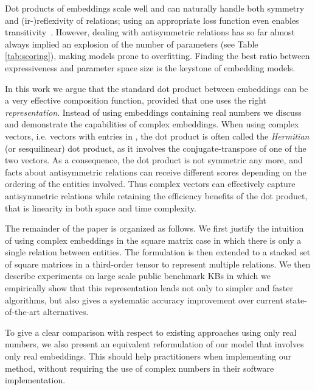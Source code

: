 \documentclass{article}
\begin{document}
Dot products of embeddings scale well and can naturally handle both symmetry and (ir-)reflexivity of relations; using an appropriate loss function even enables transitivity~\cite{bouchard2015}.
However, dealing with antisymmetric relations has so far almost always implied an explosion of the number of parameters \cite{Nickel2011,socher2013reasoning} (see Table \ref{tab:scoring}), making models prone to overfitting. Finding the best ratio between expressiveness and parameter space size is the keystone of embedding models.


In this work we argue that the standard dot product between embeddings can be a very effective composition function, provided that one uses the right \emph{representation}. Instead of using embeddings containing real numbers we discuss and demonstrate the capabilities of complex embeddings. When using complex vectors, i.e. vectors with entries in ,  the dot product is often called the \emph{Hermitian} (or sesquilinear) dot product, as it involves the conjugate-transpose of one of the two vectors. 
As a consequence, the dot product is not symmetric any more, and facts about antisymmetric relations can receive different scores depending on the ordering of the entities involved.
Thus complex vectors can effectively capture antisymmetric relations while retaining the efficiency benefits of the dot product, that is linearity in both space and time complexity. 



The remainder of the paper is organized as follows. We first justify the intuition of using complex embeddings in the square matrix case in which there is only a single relation between entities. The formulation is then extended to a stacked set of square matrices in a third-order tensor to represent multiple relations. We then describe experiments on large scale public benchmark KBs in which we empirically show that this representation leads not only to simpler and faster algorithms, but also gives a systematic accuracy improvement over current state-of-the-art alternatives.



To give a clear comparison with respect to existing approaches using only real numbers, we also present an equivalent reformulation of our model that involves only real embeddings. This should help practitioners when implementing our method, without requiring the use of complex numbers in their software implementation.
\end{document}
